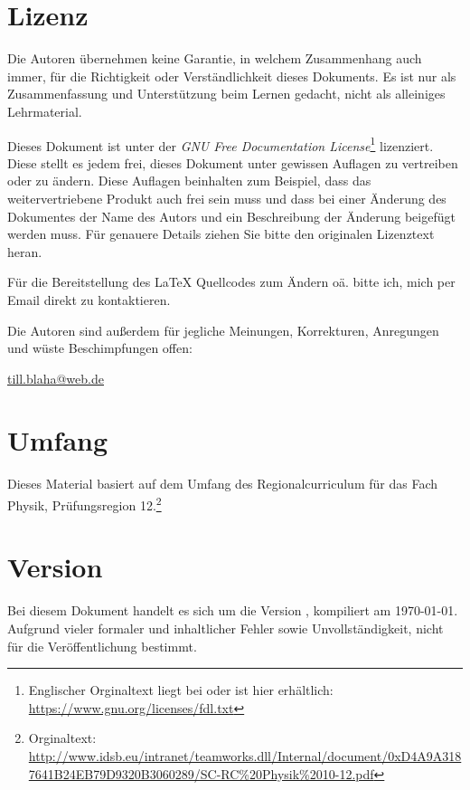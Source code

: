 \section*{Lizenz}

Die Autoren übernehmen keine Garantie, in welchem Zusammenhang auch immer, für die Richtigkeit oder Verständlichkeit dieses Dokuments. Es ist nur als Zusammenfassung und Unterstützung beim Lernen gedacht, nicht als alleiniges Lehrmaterial.

Dieses Dokument ist unter der \emph{GNU Free Documentation License}\footnote{Englischer Orginaltext liegt bei oder ist hier erhältlich: \url{https://www.gnu.org/licenses/fdl.txt}} lizenziert. Diese stellt es jedem frei, dieses Dokument unter gewissen Auflagen zu vertreiben oder zu ändern. Diese Auflagen beinhalten zum Beispiel, dass das weitervertriebene Produkt auch frei sein muss und dass bei einer Änderung des Dokumentes der Name des Autors und ein Beschreibung der Änderung beigefügt werden muss. Für genauere Details ziehen Sie bitte den originalen Lizenztext heran.

Für die Bereitstellung des \LaTeX{} Quellcodes zum Ändern oä. bitte ich, mich per Email direkt zu kontaktieren.

Die Autoren sind außerdem für jegliche Meinungen, Korrekturen, Anregungen und wüste Beschimpfungen offen:

\href{mailto:till.blaha@web.de}{till.blaha@web.de}


\section*{Umfang}

Dieses Material basiert auf dem Umfang des \glqq Regionalcurriculum für das Fach Physik, Prüfungsregion 12\grqq .\footnote{Orginaltext: \url{http://www.idsb.eu/intranet/teamworks.dll/Internal/document/0xD4A9A3187641B24EB79D9320B3060289/SC-RC\%20Physik\%2010-12.pdf}}


\section*{Version}

Bei diesem Dokument handelt es sich um die Version \version , kompiliert am \today . Aufgrund vieler formaler und inhaltlicher Fehler sowie Unvollständigkeit, nicht für die Veröffentlichung bestimmt.
